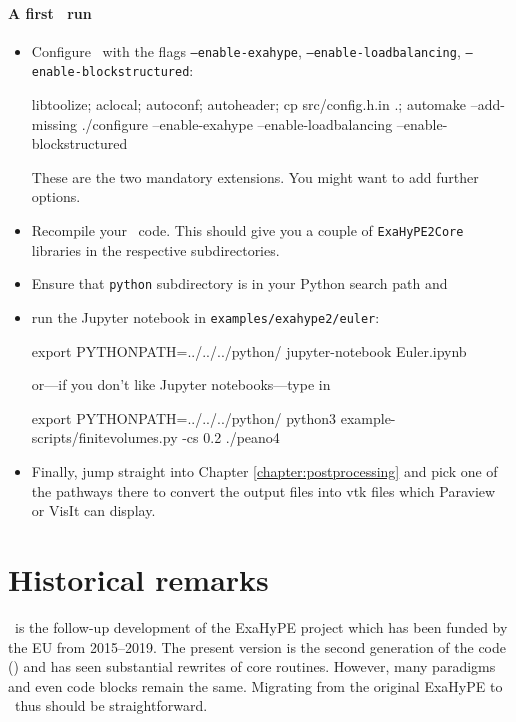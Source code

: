 \begin{framed}
\paragraph*{A first \ExaHyPE\ run}
\begin{itemize}
  \item Configure \Peano\ with the flags \texttt{--enable-exahype},
  \texttt{--enable-loadbalancing}, \texttt{--enable-blockstructured}:
  \begin{code}
libtoolize; aclocal; autoconf; autoheader; cp src/config.h.in .; automake --add-missing
./configure --enable-exahype --enable-loadbalancing --enable-blockstructured
  \end{code}
   These are the two mandatory extensions. You might want to add further options.
  \item Recompile your \Peano\ code. This should give you a couple of
  \texttt{ExaHyPE2Core} libraries in the respective subdirectories.
  \item Ensure that \texttt{python} subdirectory is in your Python search path
  and
  \item run the Jupyter notebook in \texttt{examples/exahype2/euler}: 
  \begin{code}
export PYTHONPATH=../../../python/
jupyter-notebook Euler.ipynb
  \end{code}
  \noindent
  or---if you don't like Jupyter notebooks---type in
  \begin{code}
export PYTHONPATH=../../../python/
python3 example-scripts/finitevolumes.py -cs 0.2
./peano4
  \end{code}
  \item Finally, jump straight into Chapter \ref{chapter:postprocessing} and
  pick one of the pathways there to convert the output files into vtk files
  which Paraview or VisIt can display.
\end{itemize}
\end{framed}



\section{Historical remarks}

\ExaHyPE\ is the follow-up development of the ExaHyPE project which has
been funded by the EU from 2015--2019.
The present version is the second generation of the code (\ExaHyPE) and has
seen substantial rewrites of core routines.
However, many paradigms and even code blocks remain the same.
Migrating from the original ExaHyPE to \ExaHyPE\ thus should be straightforward.


